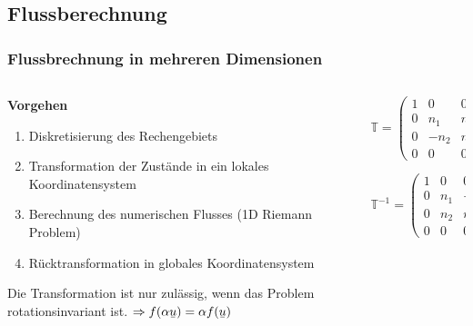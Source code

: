 \documentclass[
	11pt, %
	aspectratio=169, %
]{beamer}
\begin{document}
\subsection{Flussberechnung}

\begin{frame}
	\frametitle{Flussbrechnung in mehreren Dimensionen}
	\begin{columns}[c] %
		\begin{column}{0.55\textwidth} %
			\textbf{Vorgehen}
			\vspace*{0.3cm}
			\begin{enumerate}
				\item Diskretisierung des Rechengebiets
				\item Transformation der Zustände in ein lokales Koordinatensystem
				\item Berechnung des numerischen Flusses (1D Riemann Problem)
				\item Rücktransformation in globales Koordinatensystem
			\end{enumerate}
			\vspace*{0.5cm}
			Die Transformation ist nur zulässig, wenn das Problem rotationsinvariant ist.
			\newline 
			$\Rightarrow  f(\alpha \barbelow{u}) = \alpha f(\barbelow{u})$
		\end{column}
		\begin{column}{0.4\textwidth} %
			\begin{equation}
				\mathbb{T} = \begin{pmatrix}
					1 & 0 & 0 & 0\\
					0 & n_1 & n_2 & 0 \\
					0 & -n_2 & n_1 & 0 \\
					0 & 0   & 0 & 1
					\end{pmatrix}
			\end{equation}

			\begin{equation}
				\mathbb{T}^{-1} = \begin{pmatrix}
					1 & 0 & 0 & 0\\
					0 & n_1 & -n_2 & 0 \\
					0 & n_2 & n_1 & 0 \\
					0 & 0   & 0 & 1
					\end{pmatrix}
			\end{equation}
		\end{column}
	\end{columns}


\end{frame}	
\end{document}
